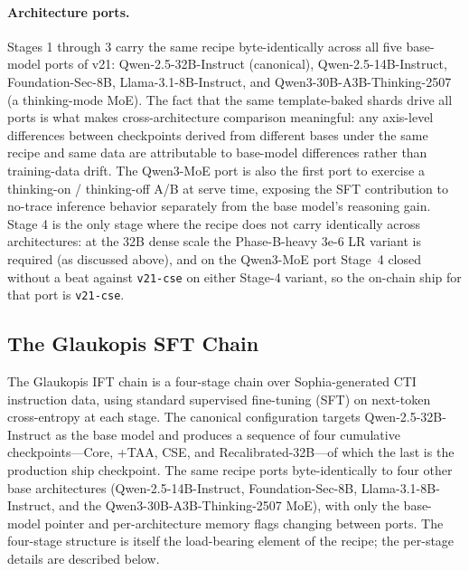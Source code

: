 \documentclass[webpdf,contemporary,large]{oup-authoring-template}
\theoremstyle{thmstyleone}
\theoremstyle{thmstyletwo}
\theoremstyle{thmstylethree}
\begin{document}
\paragraph{Architecture ports.}
Stages 1 through 3 carry the same recipe byte-identically across all five base-model ports of v21: Qwen-2.5-32B-Instruct (canonical), Qwen-2.5-14B-Instruct, Foundation-Sec-8B, Llama-3.1-8B-Instruct, and Qwen3-30B-A3B-Thinking-2507 (a thinking-mode MoE). The fact that the same template-baked shards drive all ports is what makes cross-architecture comparison meaningful: any axis-level differences between checkpoints derived from different bases under the same recipe and same data are attributable to base-model differences rather than training-data drift. The Qwen3-MoE port is also the first port to exercise a thinking-on / thinking-off A/B at serve time, exposing the SFT contribution to no-trace inference behavior separately from the base model's reasoning gain. Stage 4 is the only stage where the recipe does not carry identically across architectures: at the 32B dense scale the Phase-B-heavy 3e-6 LR variant is required (as discussed above), and on the Qwen3-MoE port Stage~4 closed without a beat against \texttt{v21-cse} on either Stage-4 variant, so the on-chain ship for that port is \texttt{v21-cse}.

\subsection{The Glaukopis SFT Chain}
\label{sec:glaukopis-sft}

The Glaukopis IFT chain is a four-stage chain over Sophia-generated CTI instruction data, using standard supervised fine-tuning (SFT) on next-token cross-entropy at each stage. The canonical configuration targets Qwen-2.5-32B-Instruct as the base model and produces a sequence of four cumulative checkpoints---Core, +TAA, CSE, and Recalibrated-32B---of which the last is the production ship checkpoint. The same recipe ports byte-identically to four other base architectures (Qwen-2.5-14B-Instruct, Foundation-Sec-8B, Llama-3.1-8B-Instruct, and the Qwen3-30B-A3B-Thinking-2507 MoE), with only the base-model pointer and per-architecture memory flags changing between ports. The four-stage structure is itself the load-bearing element of the recipe; the per-stage details are described below.
\end{document}
